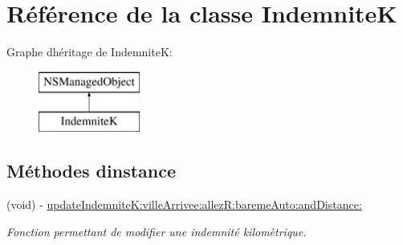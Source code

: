\hypertarget{interface_indemnite_k}{}\section{Référence de la classe Indemnite\+K}
\label{interface_indemnite_k}
Graphe d\textquotesingle{}héritage de Indemnite\+K\+:\begin{figure}[H]
\begin{center}
\leavevmode
\includegraphics[height=2.000000cm]{interface_indemnite_k}
\end{center}
\end{figure}
\subsection*{Méthodes d\textquotesingle{}instance}
\begin{DoxyCompactItemize}
\item 
(void) -\/ \hyperlink{interface_indemnite_k_a66a362b552379186741e23882dfa8466}{update\+Indemnite\+K\+:ville\+Arrivee\+:allez\+R\+:bareme\+Auto\+:and\+Distance\+:}
\begin{DoxyCompactList}\small\item\em Fonction permettant de modifier une indemnité kilomètrique. \end{DoxyCompactList}\end{DoxyCompactItemize}
